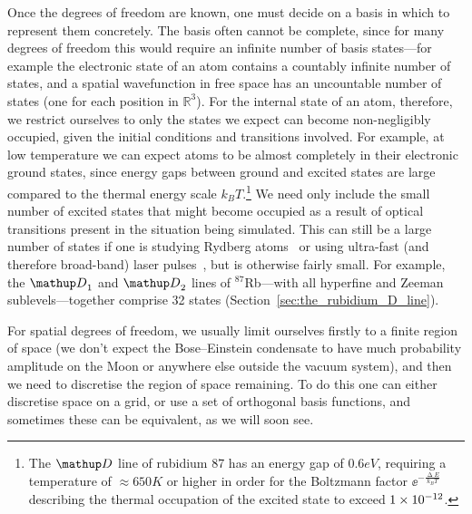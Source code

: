 Once the degrees of freedom are known, one must decide on a basis in which to represent them concretely. The basis often cannot be complete, since for many degrees of freedom this would require an infinite number of basis states---for example the electronic state of an atom contains a countably infinite number of states, and a spatial wavefunction in free space has an uncountable number of states (one for each position in $\mathbb{R}^3$). For the internal state of an atom, therefore, we restrict ourselves to only the states we expect can become non-negligibly occupied, given the initial conditions and transitions involved. For example, at low temperature we can expect atoms to be almost completely in their electronic ground states, since energy gaps between ground and excited states are large compared to the thermal energy scale $k_B T$.\footnote{The $\up{D}$ line of rubidium 87 has an energy gap of $0.6\unit{eV}$, requiring a temperature of $\approx 650\unit{K}$ or higher in order for the Boltzmann factor $\ee^{-\frac{\upDelta E}{k_B T}}$ describing the thermal occupation of the excited state to exceed $1\times 10^{-12}$.} We need only include the small number of excited states that might become occupied as a result of optical transitions present in the situation being simulated. This can still be a large number of states if one is studying Rydberg atoms~\cite{saffman_quantum_2010, urban_observation_2009} or using ultra-fast (and therefore broad-band) laser pulses~\cite{blinov_broadband_2006, mcculloch_high-coherence_2013, brabec_intense_2000}, but is otherwise fairly small. For example, the $\up{D}_1$ and $\up{D}_2$ lines of $^{87}$Rb---with all hyperfine and Zeeman sublevels---together comprise 32 states (Section~\ref{sec:the_rubidium_D_line}).

For spatial degrees of freedom, we usually limit ourselves firstly to a finite region of space (we don't expect the Bose--Einstein condensate to have much probability amplitude on the Moon or anywhere else outside the vacuum system), and then we need to discretise the region of space remaining. To do this one can either discretise space on a grid, or use a set of orthogonal basis functions, and sometimes these can be equivalent, as we will soon see.

